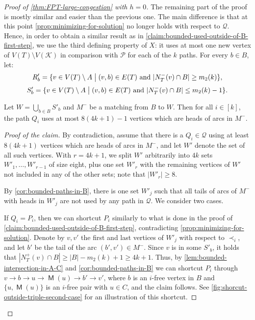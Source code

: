 \documentclass[a4paper,UKenglish,cleveref, autoref, thm-restate]{lipics-v2021}
\DeclareMathOperator{\Mat}{\mathsf M}
\renewcommand{\mid}{\bigm|}
\begin{document}
\begin{proof}[Proof of \autoref{thm:FPT-large-congestion} with $h = 0$]
The remaining part of the proof is mostly similar and easier than the previous one.
The main difference is that at this point \autoref{prop:minimizing-for-solution}  no longer holds with respect to $\mathcal{Q}$.
Hence, in order to obtain a similar result as in \autoref{claim:bounded-used-outside-of-B-first-step}, we use the third defining property of $X$: it uses at most one new vertex of $V(T) \setminus V(\mathcal{K})$ in comparison with $\mathcal{P}$ for each of the $k$ paths. 
For every $b \in B$, let:
\[R'_b = \{v \in V(T) \setminus A \mid (v,b) \in E(T) \text{ and } |N^-_T(v) \cap B| \geq m_2(k)\},\]
\[S'_b = \{v \in V(T) \setminus A \mid (v,b) \in E(T) \text{ and } |N^-_T(v) \cap B| \leq m_2(k) - 1\}.\]




\begin{claim}\label{claim:bounded-used-outside-of-B-second-step}
Let $W = \bigcup_{b \in B}S'_b$ and $M^-$ be a matching from $B$ to $W$.
Then for all $i \in [k]$, the path $Q_i$ uses at most $8(4k+1)-1$ vertices which are heads of arcs in $M^-$.
\end{claim}

\begin{proof}[Proof of the claim]
By contradiction, assume that there is a $Q_i \in \mathcal{Q}$ using at least $8(4k+1)$ vertices which are heads of arcs in $M^-$, and let $W'$ denote the set of all such vertices.
With $r = 4k+1$, we split $W'$ arbitrarily into $4k$ sets $W'_1, \ldots, W'_{r-1}$ of size eight, plus one set $W'_r$ with the remaining vertices of $W'$ not included in any of the other sets; note that $|W'_r| \geq 8$.

By \autoref{cor:bounded-paths-in-B}, there is one set $W'_j$ such that all tails of arcs of $M^-$ with heads in $W'_j$ are not used by any path in $\mathcal{Q}$.
We consider two cases.

If $Q_i = P_i$, then we can shortcut $P_i$ similarly to what is done in the proof of \autoref{claim:bounded-used-outside-of-B-first-step}, contradicting \autoref{prop:minimizing-for-solution}.
Denote by $v,v'$ the first and last vertices of $W'_j$ with respect to $\prec_i$, and let $b'$ be the tail of the arc $(b', v') \in M^-$.
Since $v$ is in some $S'_b$, it holds that $|N^+_T(v) \cap B| \geq |B| - m_2(k) + 1 \geq 4k+1$.
Thus, by \autoref{lem:bounded-intersection-in-A-C} and \autoref{cor:bounded-paths-in-B} we can shortcut $P_i$ through $v \to b \to u \to \Mat(u) \to b' \to v'$, where $b$ is an $i$-free vertex in $B$ and $\{u, \Mat(u)\}$ is an $i$-free pair with $u \in C$, and the claim follows.
See \autoref{fig:shorcut-outside-triple-second-case} for an illustration of this shortcut.


\end{proof}
\end{proof}
\end{document}
